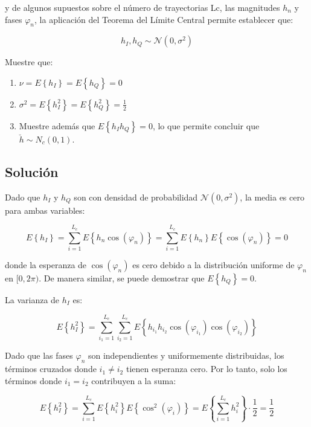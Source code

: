 \documentclass[11pt]{article}
\begin{document}
y de algunos supuestos sobre el número de trayectorias Lc, las magnitudes \(h_n\) y fases $\varphi_n$, la aplicación del Teorema del Límite Central permite establecer que:

\begin{equation*}
    h_I, h_Q \sim \mathcal{N}(0, \sigma^2)
\end{equation*}

Muestre que:

\begin{enumerate}
    \item \(\nu = E\left\{h_I\right\} = E\left\{h_Q\right\} = 0\)
    \item \(\sigma^2 = E\left\{h_I^2\right\} = E\left\{h_Q^2\right\} = \frac{1}{2}\)
    \item Muestre además que \(E\left\{h_I h_Q\right\} = 0\), lo que permite concluir que \(\breve{h} \sim N_c(0,1)\).
\end{enumerate}

\subsection*{Solución}


Dado que \(h_I\) y \(h_Q\) son con densidad de probabilidad \(\mathcal{N}(0, \sigma^2)\), la media es cero para ambas variables:

\[
E\left\{h_I\right\} = \sum_{i=1}^{L_c} E\left\{h_n \cos(\varphi_n)\right\} = \sum_{i=1}^{L_c} E\left\{h_n\right\} E\left\{\cos(\varphi_n)\right\} = 0
\]

donde la esperanza de \(\cos(\varphi_n)\) es cero debido a la distribución uniforme de \(\varphi_n\) en \([0, 2\pi)\). De manera similar, se puede demostrar que \(E\left\{h_Q\right\} = 0\).


La varianza de \(h_I\) es:

\[
E\left\{h_I^2\right\} = \sum_{i_1 = 1}^{L_c} \sum_{i_2 = 1}^{L_c} E\left\{h_{i_1} h_{i_2} \cos(\varphi_{i_1}) \cos(\varphi_{i_2})\right\}
\]

Dado que las fases \(\varphi_n\) son independientes y uniformemente distribuidas, los términos cruzados donde \(i_1 \neq i_2\) tienen esperanza cero. Por lo tanto, solo los términos donde \(i_1 = i_2\) contribuyen a la suma:

\[
E\left\{h_I^2\right\} = \sum_{i=1}^{L_c} E\left\{h_i^2\right\} E\left\{\cos^2(\varphi_i)\right\} = E\left\{\sum_{i = 1}^{L_c} h_i^2 \right\}  \cdot \frac{1}{2} = \frac{1}{2}
\]
\end{document}
